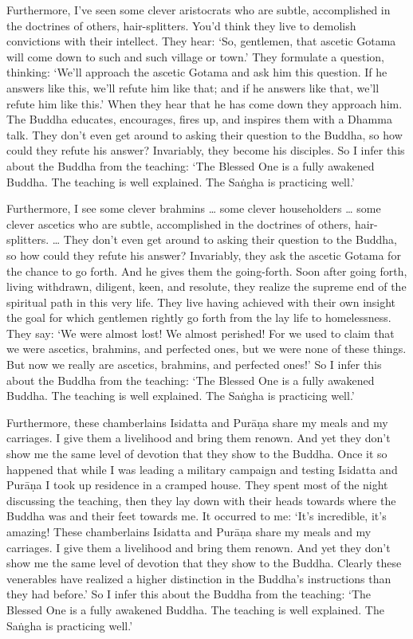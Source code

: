\documentclass[12pt,openany]{book}%
\begin{document}
Furthermore, I’ve seen some clever aristocrats who are subtle, accomplished in the doctrines of others, hair-splitters. You’d think they live to demolish convictions with their intellect. They hear: ‘So, gentlemen, that ascetic Gotama will come down to such and such village or town.’ They formulate a question, thinking: ‘We’ll approach the ascetic Gotama and ask him this question. If he answers like this, we’ll refute him like that; and if he answers like that, we’ll refute him like this.’ When they hear that he has come down they approach him. The Buddha educates, encourages, fires up, and inspires them with a Dhamma talk. They don’t even get around to asking their question to the Buddha, so how could they refute his answer? Invariably, they become his disciples. So I infer this about the Buddha from the teaching: ‘The Blessed One is a fully awakened Buddha. The teaching is well explained. The \textsanskrit{Saṅgha} is practicing well.’ 

Furthermore, I see some clever brahmins … some clever householders … some clever ascetics who are subtle, accomplished in the doctrines of others, hair-splitters. … They don’t even get around to asking their question to the Buddha, so how could they refute his answer? Invariably, they ask the ascetic Gotama for the chance to go forth. And he gives them the going-forth. Soon after going forth, living withdrawn, diligent, keen, and resolute, they realize the supreme end of the spiritual path in this very life. They live having achieved with their own insight the goal for which gentlemen rightly go forth from the lay life to homelessness. They say: ‘We were almost lost! We almost perished! For we used to claim that we were ascetics, brahmins, and perfected ones, but we were none of these things. But now we really are ascetics, brahmins, and perfected ones!’ So I infer this about the Buddha from the teaching: ‘The Blessed One is a fully awakened Buddha. The teaching is well explained. The \textsanskrit{Saṅgha} is practicing well.’ 

Furthermore, these chamberlains Isidatta and \textsanskrit{Purāṇa} share my meals and my carriages. I give them a livelihood and bring them renown. And yet they don’t show me the same level of devotion that they show to the Buddha. Once it so happened that while I was leading a military campaign and testing Isidatta and \textsanskrit{Purāṇa} I took up residence in a cramped house. They spent most of the night discussing the teaching, then they lay down with their heads towards where the Buddha was and their feet towards me. It occurred to me: ‘It’s incredible, it’s amazing! These chamberlains Isidatta and \textsanskrit{Purāṇa} share my meals and my carriages. I give them a livelihood and bring them renown. And yet they don’t show me the same level of devotion that they show to the Buddha. Clearly these venerables have realized a higher distinction in the Buddha’s instructions than they had before.’ So I infer this about the Buddha from the teaching: ‘The Blessed One is a fully awakened Buddha. The teaching is well explained. The \textsanskrit{Saṅgha} is practicing well.’ 
\end{document}
